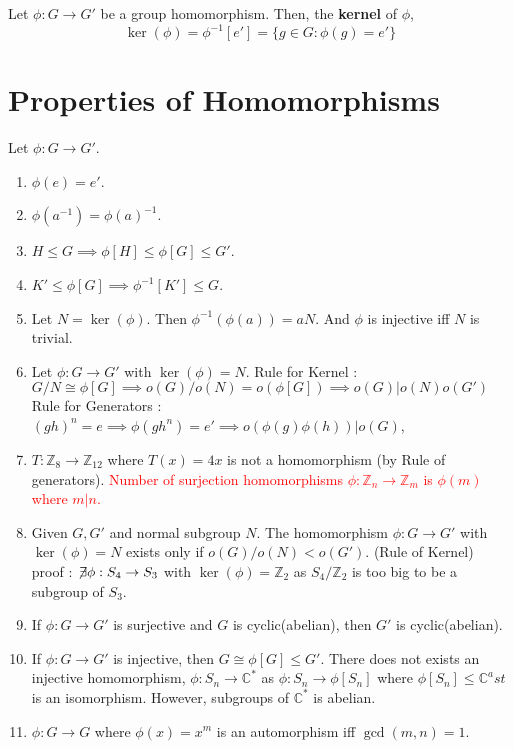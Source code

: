 \begin{definition}
	Let $\phi : G \to G'$ be a group homomorphism.
	Then, the \textbf{kernel} of $\phi$, 
	$$ \ker(\phi) = \phi^{-1}[e'] = \{ g \in G : \phi(g) = e' \} $$
\end{definition}

\section{Properties of Homomorphisms}
Let $\phi : G \to G'$.
\begin{enumerate}
	\item $\phi(e) = e'$.
	\item $\phi(a^{-1}) = \phi(a)^{-1}$.
	\item $H \le G \implies \phi[H] \le \phi[G] \le G'$.
	\item $K' \le \phi[G] \implies \phi^{-1}[K'] \le G$.
	\item Let $N = \ker(\phi)$. Then $\phi^{-1}(\phi(a)) = aN$. And $\phi$ is injective iff $N$ is trivial.
	\item Let $\phi : G \to G'$ with $\ker(\phi)=N$.
		\subitem Rule for Kernel : $G/N \cong \phi[G] \implies o(G)/o(N) = o(\phi[G]) \implies o(G) | o(N)o(G')$
		\subitem Rule for Generators : $(gh)^n = e \implies \phi(gh^n) = e' \implies o(\phi(g) \phi(h))|o(G)$,
	\item $T : \mathbb{Z}_8 \to \mathbb{Z}_{12}$ where $T(x)=4x$ is not a homomorphism (by Rule of generators).
		\subitem \textcolor{red}{Number of surjection homomorphisms $\phi : \mathbb{Z}_n \to \mathbb{Z}_m$ is $\phi(m)$ where $m|n$.}
	\item Given $G,G'$ and normal subgroup $N$. The homomorphism $\phi : G \to G'$ with $\ker(\phi)=N$ exists only if $o(G)/o(N) < o(G')$. (Rule of Kernel)\\
	proof : $\not\!\exists \phi : S_4 \to S_3$ with $\ker(\phi) = \mathbb{Z}_2$ as $S_4/\mathbb{Z}_2$ is too big to be a subgroup of $S_3$.
	\item If $\phi : G \to G'$ is surjective and $G$ is cyclic(abelian), then $G'$ is cyclic(abelian).
	\item If $\phi : G \to G'$ is injective, then $G \cong \phi[G] \le G'$.
		\subitem There does not exists an injective homomorphism, $\phi : S_n \to \mathbb{C}^\ast$ as $\phi : S_n \to \phi[S_n]$ where $\phi[S_n] \le \mathbb{C}^ast$ is an isomorphism. However, subgroups of $\mathbb{C}^\ast$ is abelian.
	\item $\phi : G \to G$ where $\phi(x)=x^m$ is an automorphism iff $\gcd(m,n) = 1$.
\end{enumerate}

